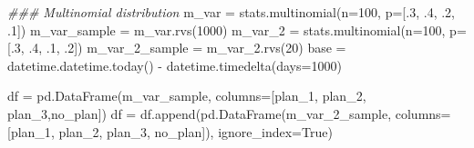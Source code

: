 \documentclass[]{tufte-book}
\newenvironment{Shaded}{}{}
\newcommand{\CommentTok}[1]{\textcolor[rgb]{0.38,0.63,0.69}{\textit{#1}}}
\newcommand{\DecValTok}[1]{\textcolor[rgb]{0.25,0.63,0.44}{#1}}
\newcommand{\FloatTok}[1]{\textcolor[rgb]{0.25,0.63,0.44}{#1}}
\newcommand{\NormalTok}[1]{#1}
\newcommand{\OperatorTok}[1]{\textcolor[rgb]{0.40,0.40,0.40}{#1}}
\newcommand{\StringTok}[1]{\textcolor[rgb]{0.25,0.44,0.63}{#1}}
\newcommand{\VariableTok}[1]{\textcolor[rgb]{0.10,0.09,0.49}{#1}}
\theoremstyle{definition}
\theoremstyle{definition}
\theoremstyle{definition}
\theoremstyle{remark}
\begin{document}
\begin{Shaded}
\begin{Highlighting}[]

\CommentTok{\#\#\# Multinomial distribution}
\NormalTok{m\_var }\OperatorTok{=}\NormalTok{ stats.multinomial(n}\OperatorTok{=}\DecValTok{100}\NormalTok{, p}\OperatorTok{=}\NormalTok{[}\FloatTok{.3}\NormalTok{, }\FloatTok{.4}\NormalTok{, }\FloatTok{.2}\NormalTok{, }\FloatTok{.1}\NormalTok{])}
\NormalTok{m\_var\_sample }\OperatorTok{=}\NormalTok{ m\_var.rvs(}\DecValTok{1000}\NormalTok{)}
\NormalTok{m\_var\_2 }\OperatorTok{=}\NormalTok{ stats.multinomial(n}\OperatorTok{=}\DecValTok{100}\NormalTok{, p}\OperatorTok{=}\NormalTok{[}\FloatTok{.3}\NormalTok{, }\FloatTok{.4}\NormalTok{, }\FloatTok{.1}\NormalTok{, }\FloatTok{.2}\NormalTok{])}
\NormalTok{m\_var\_2\_sample }\OperatorTok{=}\NormalTok{ m\_var\_2.rvs(}\DecValTok{20}\NormalTok{)}
\NormalTok{base }\OperatorTok{=}\NormalTok{ datetime.datetime.today() }\OperatorTok{{-}}\NormalTok{ datetime.timedelta(days}\OperatorTok{=}\DecValTok{1000}\NormalTok{)}

\NormalTok{df }\OperatorTok{=}\NormalTok{ pd.DataFrame(m\_var\_sample, }
\NormalTok{columns}\OperatorTok{=}\NormalTok{[}\StringTok{\textquotesingle{}plan\_1\textquotesingle{}}\NormalTok{, }\StringTok{\textquotesingle{}plan\_2\textquotesingle{}}\NormalTok{, }\StringTok{\textquotesingle{}plan\_3\textquotesingle{}}\NormalTok{,}\StringTok{\textquotesingle{}no\_plan\textquotesingle{}}\NormalTok{])}
\NormalTok{df }\OperatorTok{=}\NormalTok{ df.append(pd.DataFrame(m\_var\_2\_sample, }
\NormalTok{columns}\OperatorTok{=}\NormalTok{[}\StringTok{\textquotesingle{}plan\_1\textquotesingle{}}\NormalTok{, }\StringTok{\textquotesingle{}plan\_2\textquotesingle{}}\NormalTok{, }\StringTok{\textquotesingle{}plan\_3\textquotesingle{}}\NormalTok{, }\StringTok{\textquotesingle{}no\_plan\textquotesingle{}}\NormalTok{]),}
\NormalTok{ignore\_index}\OperatorTok{=}\VariableTok{True}\NormalTok{)}


\end{Highlighting}
\end{Shaded}
\end{document}
